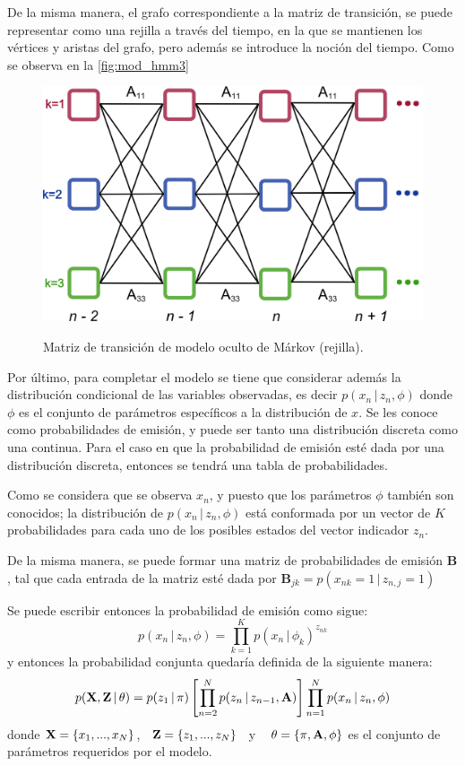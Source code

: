 De la misma manera, el grafo correspondiente a la matriz de transición, se puede representar como una rejilla a través del tiempo, en la que se mantienen los vértices y aristas del grafo, pero además se introduce la noción del tiempo. Como se observa en la \autoref{fig:mod_hmm3} 

\begin{figure}[tp]
        \myfloatalign
        {\includegraphics[width=0.63\linewidth]{gfx/chap3/mod-hmm3}}
        \caption[Matriz de transición de HMM (rejilla)]{Matriz de transición de modelo oculto de Márkov (rejilla).}
        \label{fig:mod_hmm3}
\end{figure}

Por último, para completar el modelo se tiene que considerar además la distribución condicional de las variables observadas, es decir $p(x_n \,|\, z_n, \phi)$ donde $\phi$ es el conjunto de parámetros específicos a la distribución de $x$. Se les conoce como probabilidades de emisión, y puede ser tanto una distribución discreta como una continua. Para el caso en que la probabilidad de emisión esté dada por una distribución discreta, entonces se tendrá una tabla de probabilidades.

Como se considera que se observa $x_n$, y puesto que los parámetros $\phi$ también son conocidos; la distribución de $p(x_n \,|\, z_n, \phi)$ está conformada por un vector de $K$ probabilidades para cada uno de los posibles estados del vector indicador $z_n$.

De la misma manera, se puede formar una matriz de probabilidades de emisión $\mathbf{B}$, tal que cada entrada de la matriz esté dada por $\mathbf{B}_{jk} = p(x_{nk} = 1 \,|\, z_{n, j} = 1)$

Se puede escribir entonces la probabilidad de emisión como sigue:
\begin{equation}
p(x_n \,|\, z_n, \phi) = \prod_{k=1}^K p(x_n \,|\, \phi_k) ^ {z_{nk}}
\label{eqn:2-10}
\end{equation}
y entonces la probabilidad conjunta quedaría definida de la siguiente manera:
\begin{equation}
p(\textbf{X}, \textbf{Z} \,|\, \theta) 
= p(z_1 \,|\, \pi) \left[ \prod_{n=2}^N p(z_n \,|\, z_{n-1}, \textbf{A}) \right]
        \prod_{n=1}^N p(x_n \,|\, z_n, \phi)
\label{eqn:2-11}
\end{equation}
donde $\textbf{X} = \lbrace x_1, ..., x_N \rbrace$,~ $\textbf{Z} = \lbrace z_1, ..., z_N \rbrace$~ y ~ $\theta = \lbrace \pi, \textbf{A}, \phi \rbrace$ es el conjunto de parámetros requeridos por el modelo.

